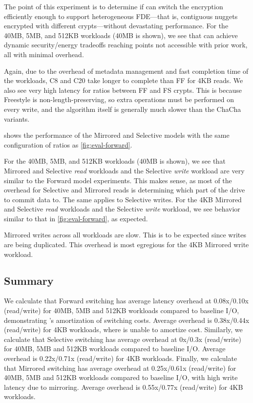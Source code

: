 

The point of this experiment is to determine if \sys can switch the encryption
efficiently enough to support heterogeneous FDE---that is, contiguous nuggets
encrypted with different crypts---without devastating performance. For the 40MB,
5MB, and 512KB workloads (40MB is shown), we see that \sys can achieve dynamic
security/energy tradeoffs reaching points not accessible with prior work, all
with minimal overhead.

Again, due to the overhead of metadata management and fast completion time of
the workloads, C8 and C20 take longer to complete than FF for 4KB reads. We also
see very high latency for ratios between FF and FS crypts. This is because
Freestyle is non-length-preserving, so extra operations must be performed on
every write, and the algorithm itself is generally much slower than the ChaCha
variants.

 shows the performance of the Mirrored and Selective models
with the same configuration of ratios as \cref{fig:eval-forward}.

For the 40MB, 5MB, and 512KB workloads (40MB is shown), we see that Mirrored and
Selective {\em read} workloads and the Selective {\em write} workload are very
similar to the Forward model experiments. This makes sense, as most of the
overhead for Selective and Mirrored reads is determining which part of the drive
to commit data to. The same applies to Selective writes. For the 4KB Mirrored
and Selective {\em read} workloads and the Selective {\em write} workload, we
see behavior similar to that in \cref{fig:eval-forward}, as expected.

Mirrored writes across all workloads are slow. This is to be expected since
writes are being duplicated. This overhead is most egregious for the 4KB
Mirrored write workload.


\subsection{Summary}\label{subsec:eval-overhead}

We calculate that Forward switching has average latency overhead at 0.08x/0.10x
(read/write) for 40MB, 5MB and 512KB workloads compared to baseline I/O,
demonstrating \sys's amortization of switching costs. Average overhead is
0.38x/0.44x (read/write) for 4KB workloads, where \sys is unable to amortize
cost. Similarly, we calculate that Selective switching has average overhead at
0x/0.3x (read/write) for 40MB, 5MB and 512KB workloads compared to baseline I/O.
Average overhead is 0.22x/0.71x (read/write) for 4KB workloads. Finally, we
calculate that Mirrored switching has average overhead at 0.25x/0.61x
(read/write) for 40MB, 5MB and 512KB workloads compared to baseline I/O, with
high write latency due to mirroring. Average overhead is 0.55x/0.77x
(read/write) for 4KB workloads.

